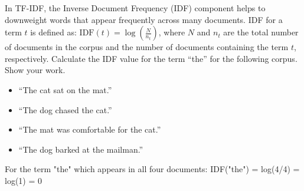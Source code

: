 \documentclass[11pt,addpoints,answers]{exam}
\begin{document}
\begin{questions}

\question[2] In TF-IDF, the Inverse Document Frequency (IDF) component helps to downweight words that appear frequently across many documents. IDF for a term $t$ is defined as: $\text{IDF}(t) = \log\left(\frac{N}{n_t}\right)$, where $N$ and $n_t$ are the total number of documents in the corpus and the number of documents containing the term $t$, respectively.
Calculate the IDF value for the term ``the'' for the following corpus. Show your work.
\begin{itemize}
  \item ``The cat sat on the mat.''
  \item ``The dog chased the cat.''
  \item ``The mat was comfortable for the cat.''
  \item ``The dog barked at the mailman.''
\end{itemize}
\begin{solution}
For the term "the" which appears in all four documents:
IDF("the") = log(4/4) = log(1) = 0
\end{solution}


\end{questions}
\end{document}
